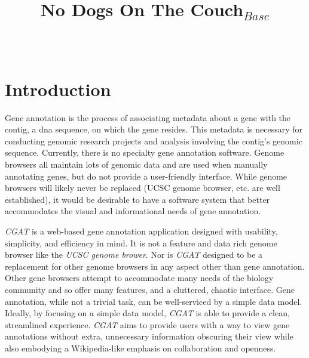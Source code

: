 \documentclass[]{IEEEtran}
\begin{document}
\title{No Dogs On The Couch$_{Base}$}


\author{
\\
}

\maketitle

\thispagestyle{empty}
\pagestyle{empty}

\section{Introduction}\label{sec:introduction}
Gene annotation is the process of associating metadata about a gene with the
contig, a dna sequence, on which the gene resides. This metadata is necessary for conducting
genomic research projects and analysis involving the contig's genomic sequence.
Currently, there is no specialty gene annotation software. Genome browsers
all maintain lots of genomic data and are used when manually annotating genes,
but do not provide a user-friendly interface. While genome browsers
will likely never be replaced (UCSC genome browser, etc. are well
established), it would be desirable to have a software system that better
accommodates the visual and informational needs of gene annotation.

\textit{CGAT} is a web-based gene annotation application designed with
usability, simplicity, and efficiency in mind. It is not a feature and data
rich genome browser like the \textit{UCSC genome brower}. Nor is \textit{CGAT}
designed to be a replacement for other genome browsers in any aspect other than
gene annotation. Other gene browsers attempt to accommodate many needs of the
biology community and so offer many features, and a cluttered, chaotic
interface. Gene annotation, while not a trivial task, can be well-serviced by a
simple data model. Ideally, by focusing on a simple data model, \textit{CGAT}
is able to provide a clean, streamlined experience. \textit{CGAT} aims to
provide users with a way to view gene annotations without extra, unnecessary
information obscuring their view while also embodying a Wikipedia-like emphasis
on collaboration and openness.
\end{document}
